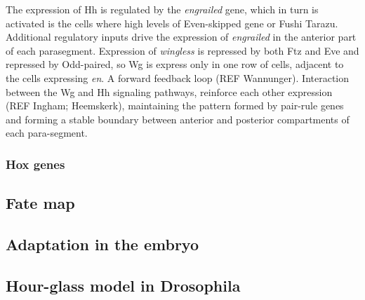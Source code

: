 The expression of Hh is regulated by the \textit{engrailed} gene, which in turn is activated is the cells where high levels of Even-skipped gene or Fushi Tarazu.
Additional regulatory inputs drive the expression of \textit{engrailed} in the anterior part of each parasegment.
Expression of \textit{wingless} is repressed by both Ftz and Eve and repressed by Odd-paired, so Wg is express only in one row of cells, adjacent to the cells expressing \textit{en}.
A forward feedback loop (REF Wannunger).
Interaction between the Wg and Hh signaling pathways, reinforce each other expression (REF Ingham; Heemskerk), maintaining the pattern formed by pair-rule genes and forming a stable boundary between anterior and posterior compartments of each para-segment.



  


\subsubsection{Hox genes}

\subsection{Fate map}


\subsection{Adaptation in the embryo}


\subsection{Hour-glass model in Drosophila}
